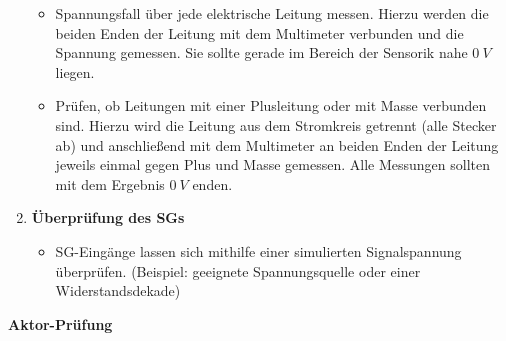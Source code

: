 \begin{enumerate}
  \begin{itemize}
  \item
    Spannungsfall über jede elektrische Leitung messen. Hierzu werden
    die beiden Enden der Leitung mit dem Multimeter verbunden und die
    Spannung gemessen. Sie sollte gerade im Bereich der Sensorik nahe
    $0~V$ liegen.
  \item
    Prüfen, ob Leitungen mit einer Plusleitung oder mit Masse verbunden
    sind. Hierzu wird die Leitung aus dem Stromkreis getrennt (alle
    Stecker ab) und anschließend mit dem Multimeter an beiden Enden der
    Leitung jeweils einmal gegen Plus und Masse gemessen. Alle Messungen
    sollten mit dem Ergebnis $0~V$ enden.
  \end{itemize}
\item
  \textbf{Überprüfung des SGs}

  \begin{itemize}
  \item
    SG-Eingänge lassen sich mithilfe einer simulierten Signalspannung
    überprüfen. (Beispiel: geeignete Spannungsquelle oder einer
    Widerstandsdekade)
  \end{itemize}
\end{enumerate}

\textbf{Aktor-Prüfung}

